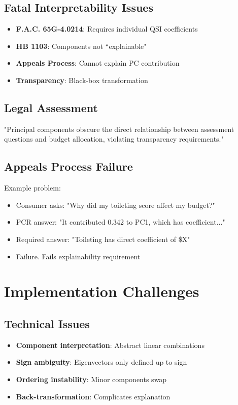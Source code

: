 \subsection{Fatal Interpretability Issues}

\begin{itemize}
    \item[\redcross] \textbf{F.A.C. 65G-4.0214}: Requires individual QSI coefficients
    \item[\redcross] \textbf{HB 1103}: Components not ``explainable"
    \item[\redcross] \textbf{Appeals Process}: Cannot explain PC contribution
    \item[\redcross] \textbf{Transparency}: Black-box transformation
\end{itemize}

\subsection{Legal Assessment}

"Principal components obscure the direct relationship between assessment questions and budget allocation, violating transparency requirements."

\subsection{Appeals Process Failure}

Example problem:
\begin{itemize}
    \item Consumer asks: "Why did my toileting score affect my budget?"
    \item PCR answer: "It contributed 0.342 to PC1, which has coefficient..."
    \item Required answer: "Toileting has direct coefficient of \$X"
    \item Failure.  Fails explainability requirement
\end{itemize}

\section{Implementation Challenges}

\subsection{Technical Issues}

\begin{itemize}
    \item \textbf{Component interpretation}: Abstract linear combinations
    \item \textbf{Sign ambiguity}: Eigenvectors only defined up to sign
    \item \textbf{Ordering instability}: Minor components swap
    \item \textbf{Back-transformation}: Complicates explanation
\end{itemize}

